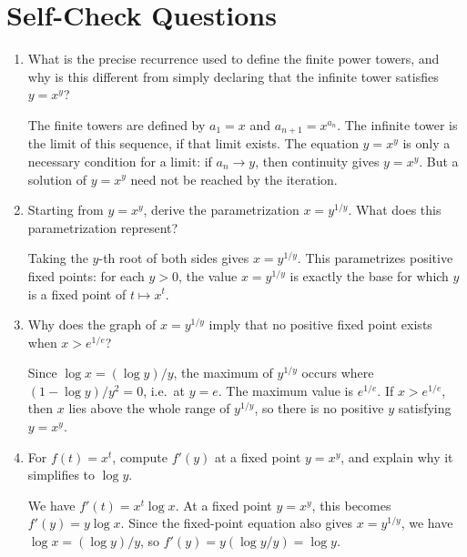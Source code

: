 \documentclass{essay}
\begin{document}
\section{Self-Check Questions}

\begin{enumerate}
  \item What is the precise recurrence used to define the finite power towers,
    and why is this different from simply declaring that the infinite tower
    satisfies \(y=x^y\)?
    \begin{answer}
      The finite towers are defined by \(a_1=x\) and
      \(a_{n+1}=x^{a_n}\). The infinite tower is the limit of this sequence,
      if that limit exists. The equation \(y=x^y\) is only a necessary
      condition for a limit: if \(a_n\to y\), then continuity gives
      \(y=x^y\). But a solution of \(y=x^y\) need not be reached by the
      iteration.
    \end{answer}

  \item Starting from \(y=x^y\), derive the parametrization
    \(x=y^{1/y}\). What does this parametrization represent?
    \begin{answer}
      Taking the \(y\)-th root of both sides gives \(x=y^{1/y}\). This
      parametrizes positive fixed points: for each \(y>0\), the value
      \(x=y^{1/y}\) is exactly the base for which \(y\) is a fixed point of
      \(t\mapsto x^t\).
    \end{answer}

  \item Why does the graph of \(x=y^{1/y}\) imply that no positive fixed point
    exists when \(x>e^{1/e}\)?
    \begin{answer}
      Since \(\log x=(\log y)/y\), the maximum of \(y^{1/y}\) occurs where
      \((1-\log y)/y^2=0\), i.e.\ at \(y=e\). The maximum value is
      \(e^{1/e}\). If \(x>e^{1/e}\), then \(x\) lies above the whole range of
      \(y^{1/y}\), so there is no positive \(y\) satisfying \(y=x^y\).
    \end{answer}

  \item For \(f(t)=x^t\), compute \(f'(y)\) at a fixed point \(y=x^y\), and
    explain why it simplifies to \(\log y\).
    \begin{answer}
      We have \(f'(t)=x^t\log x\). At a fixed point \(y=x^y\), this becomes
      \(f'(y)=y\log x\). Since the fixed-point equation also gives
      \(x=y^{1/y}\), we have \(\log x=(\log y)/y\), so
      \(f'(y)=y(\log y/y)=\log y\).
    \end{answer}


\end{enumerate}
\end{document}
